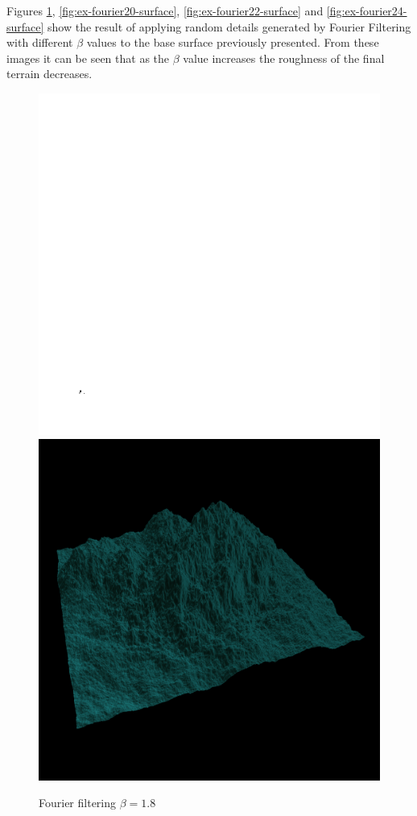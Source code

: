     Figures \ref{fig:ex-fourier18-surface}, \ref{fig:ex-fourier20-surface}, \ref{fig:ex-fourier22-surface} and \ref{fig:ex-fourier24-surface} show the result of applying random details generated by Fourier Filtering with different $\beta$ values to the base surface previously presented. From these images it can be seen that as the $\beta$ value increases the roughness of the final terrain decreases.
		
	\begin{figure}[H]
	  \centering
	  \includegraphics[width=\imagewidth]{images/results/terrains/512-1/fourier/18}
	  \includegraphics[width=\imagewidth]{images/results/terrains/512-1/fourier/18_3d}
	  \caption{Fourier filtering $\beta = 1.8$}
	  \label{fig:ex-fourier18-surface}
	\end{figure}
	
